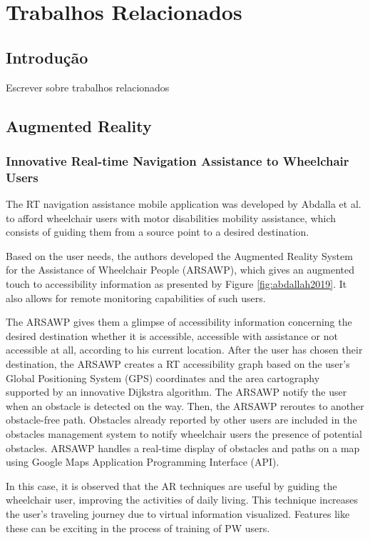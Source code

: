 \chapter{Trabalhos Relacionados}

\section{Introdução}

Escrever sobre trabalhos relacionados

\section{Augmented Reality}
\subsection{Innovative Real-time Navigation Assistance to Wheelchair Users}
The  RT navigation assistance mobile application was developed by Abdalla et al. \cite{abdallah2019} to afford wheelchair users with motor disabilities mobility assistance, which consists of guiding them from a source point to a desired destination. 

Based on the user needs, the authors developed the Augmented Reality System for the Assistance of Wheelchair People (ARSAWP), which gives an augmented touch to accessibility information as presented by Figure \ref{fig:abdallah2019}. It also allows for remote monitoring capabilities of such users. 


The ARSAWP gives them a glimpse of accessibility information concerning the desired destination whether it is accessible, accessible with assistance or not accessible at all, according to his current location. After the user has chosen their destination, the ARSAWP creates a RT accessibility graph based on the user’s Global Positioning System (GPS) coordinates and the area cartography supported by an innovative Dijkstra algorithm. The ARSAWP notify the user when an obstacle is detected on the way. Then, the ARSAWP reroutes to another obstacle-free path. Obstacles already reported by other users are included in the obstacles management system to notify wheelchair users the presence of potential obstacles. ARSAWP handles a real-time display of obstacles and paths on a map using Google Maps Application Programming Interface (API).

In this case, it is observed that the AR techniques are useful by guiding the wheelchair user, improving the activities of daily living. This technique increases the user's traveling journey due to virtual information visualized. Features like these can be exciting in the process of training of PW users.

